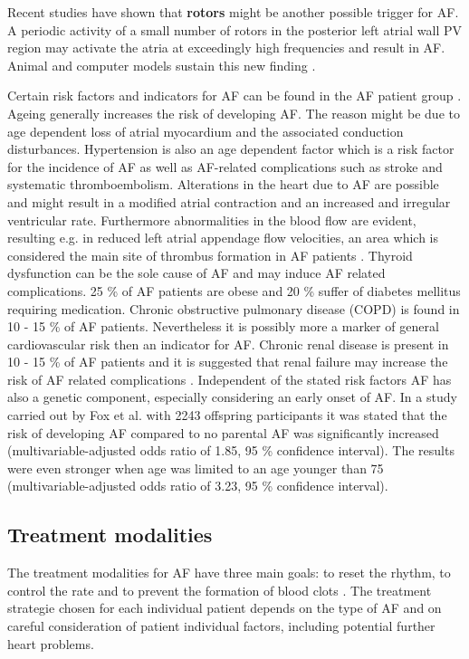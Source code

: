 \documentclass[type=dr, dr=rernat, accentcolor=tud7b,colorbacktitle, bigchapter, openright, twoside, 12pt ]{tudthesis}
\begin{document}
Recent studies have shown that \textbf{rotors} might be another possible trigger for AF. A periodic activity of a small number of rotors in 
the posterior left atrial wall PV region may activate the atria at exceedingly high frequencies and result in AF. Animal and computer 
models sustain this new finding \cite{Jal03}. \newline

Certain risk factors and indicators for AF can be found in the AF patient group \cite{CE09}. Ageing generally increases the risk of 
developing AF. The reason might be due to age dependent loss of atrial myocardium and the associated conduction disturbances. Hypertension 
is also an age dependent factor which is a risk factor for the incidence of AF as well as AF-related complications such as stroke and 
systematic thromboembolism. Alterations in the heart due to AF are possible and might result in a modified atrial contraction and an 
increased and irregular ventricular rate. Furthermore abnormalities in the blood flow are evident, resulting e.g. in reduced left atrial 
appendage flow velocities, an area which is considered the main site of thrombus formation in AF patients \cite{ESC12}. Thyroid dysfunction
can be the sole cause of AF and may induce AF related complications. 25 \% of AF patients are obese \cite{Nab09} and 20 \% suffer of 
diabetes mellitus requiring medication. Chronic obstructive pulmonary 
disease (COPD) is found in 10 - 15 \% of AF patients. Nevertheless it is possibly more a marker of general cardiovascular risk then an 
indicator for AF. Chronic renal disease is present in 10 - 15 \% of AF patients and it is suggested that renal failure may increase the 
risk of AF related complications \cite{CE09}. Independent of the stated risk factors AF has also a genetic component, especially 
considering an early onset of AF. In a study carried out by Fox et al. \cite{Fox09} with 2243 offspring participants it was stated that the 
risk of developing AF compared to no parental AF was significantly increased (multivariable-adjusted odds ratio of 1.85, 95 \% confidence 
interval). The results were even stronger when age was limited to an age younger than 75 (multivariable-adjusted odds ratio of 3.23, 95 \% 
confidence interval). 


\subsection*{Treatment modalities}

The treatment modalities for AF have three main goals: to reset the rhythm, to control the rate and to prevent the formation of blood 
clots \cite{Mayo} \cite{CE09}. The treatment strategie chosen for each individual patient depends on the type of AF and on careful 
consideration of patient individual factors, including potential further heart problems. \newline
\end{document}
